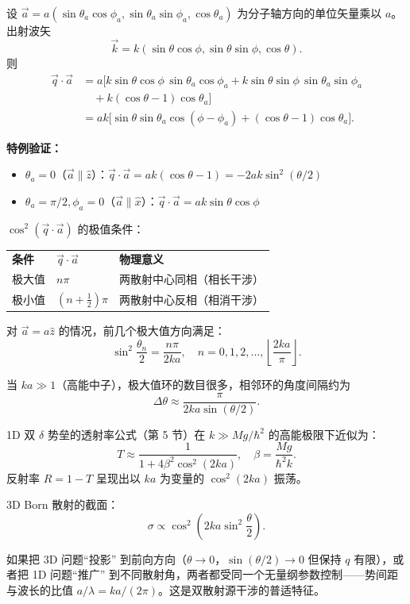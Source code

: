 \begin{derivationbox}

设 $\vec{a} = a(\sin\theta_a\cos\phi_a, \sin\theta_a\sin\phi_a, \cos\theta_a)$ 为分子轴方向的单位矢量乘以 $a$。出射波矢
\[
\vec{k} = k(\sin\theta\cos\phi, \sin\theta\sin\phi, \cos\theta).
\]
则
\begin{align*}
\vec{q}\cdot\vec{a} &= a \bigl[ k\sin\theta\cos\phi\, \sin\theta_a\cos\phi_a + k\sin\theta\sin\phi\, \sin\theta_a\sin\phi_a \\
&\quad + k(\cos\theta - 1)\cos\theta_a \bigr] \\
&= ak \bigl[ \sin\theta\sin\theta_a\cos(\phi - \phi_a) + (\cos\theta - 1)\cos\theta_a \bigr].
\end{align*}

\textbf{特例验证：}
\begin{itemize}
    \item $\theta_a = 0$（$\vec{a} \parallel \hat{z}$）：$\vec{q}\cdot\vec{a} = ak(\cos\theta - 1) = -2ak\sin^2(\theta/2)$
    \item $\theta_a = \pi/2, \phi_a = 0$（$\vec{a} \parallel \hat{x}$）：$\vec{q}\cdot\vec{a} = ak\sin\theta\cos\phi$
\end{itemize}
\end{derivationbox}

\begin{derivationbox}[极大值与极小值方向]

$\cos^2(\vec{q}\cdot\vec{a})$ 的极值条件：

\begin{tabular}{lll}
\textbf{条件} & $\vec{q}\cdot\vec{a}$ & \textbf{物理意义} \\
极大值 & $n\pi$ & 两散射中心同相（相长干涉） \\
极小值 & $\left(n + \frac{1}{2}\right)\pi$ & 两散射中心反相（相消干涉） \\
\end{tabular}

对 $\vec{a} = a\hat{z}$ 的情况，前几个极大值方向满足：
\[
\sin^2\frac{\theta_n}{2} = \frac{n\pi}{2ka}, \quad n = 0, 1, 2, \dots, \left\lfloor \frac{2ka}{\pi} \right\rfloor.
\]

当 $ka \gg 1$（高能中子），极大值环的数目很多，相邻环的角度间隔约为
\[
\Delta\theta \approx \frac{\pi}{2ka\sin(\theta/2)}.
\]
\end{derivationbox}

\begin{derivationbox}

1D 双 $\delta$ 势垒的透射率公式（第 5 节）在 $k \gg Mg/\hbar^2$ 的高能极限下近似为：
\[
T \approx \frac{1}{1 + 4\beta^2\cos^2(2ka)}, \quad \beta = \frac{Mg}{\hbar^2 k}.
\]
反射率 $R = 1 - T$ 呈现出以 $ka$ 为变量的 $\cos^2(2ka)$ 振荡。

3D Born 散射的截面：
\[
\sigma \propto \cos^2\!\left(2ka\sin^2\frac{\theta}{2}\right).
\]

如果把 3D 问题``投影'' 到前向方向（$\theta \to 0$，$\sin(\theta/2) \to 0$ 但保持 $q$ 有限），或者把 1D 问题``推广'' 到不同散射角，两者都受同一个无量纲参数控制——势间距与波长的比值 $a/\lambda = ka/(2\pi)$。这是双散射源干涉的普适特征。
\end{derivationbox}

